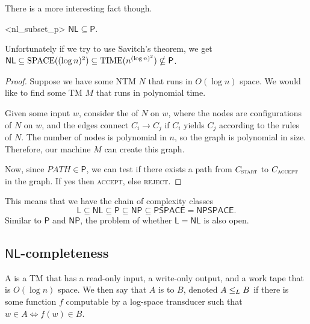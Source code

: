 \documentclass{standalone}
\begin{document}
There is a more interesting fact though.
\begin{proposition}<nl_subset_p>
  \(\mathsf{NL} \subseteq \mathsf{P}\).
\end{proposition}
Unfortunately if we try to use Savitch's theorem, we get
\(\mathsf{NL} \subseteq \operatorname{SPACE}((\log n)^2)
              \subseteq \operatorname{TIME}(n^{(\log n)^2}) \nsubseteq \mathsf{P}\).
\begin{proof}
  Suppose we have some \textsf{NTM} \(N\) that runs in \(O(\log n)\) space.
  We would like to find some \textsf{TM} \(M\) that runs in polynomial time.

  Given some input \(w\),
  consider the  of \(N\) on \(w\),
  where the nodes are configurations of \(N\) on \(w\),
  and the edges connect \(C_i \to C_j\) if \(C_i\) yields \(C_j\)
  according to the rules of \(N\).
  The number of nodes is polynomial in \(n\),
  so the graph is polynomial in size.
  Therefore, our machine \(M\) can create this graph.

  Now, since \(\textit{PATH} \in \mathsf{P}\),
  we can test if there exists a path from
  \(C_{\textsc{start}}\) to \(C_{\textsc{accept}}\) in the graph.
  If yes then \textsc{accept}, else \textsc{reject}.
\end{proof}

This means that we have the chain of complexity classes
\[
  \mathsf{L} \subseteq \mathsf{NL}
             \subseteq \mathsf{P}
             \subseteq \mathsf{NP}
             \subseteq \mathsf{PSPACE} = \mathsf{NPSPACE}.
\]
Similar to \(\mathsf{P}\) and \(\mathsf{NP}\),
the problem of whether \(\mathsf L = \mathsf{NL}\) is also open.

\subsection{\texorpdfstring{\(\mathsf{NL}\)}{NL}-completeness}
\begin{definition}
  A  is a \textsf{TM} that has a read-only input,
  a write-only output, and a work tape that is \(O(\log n)\) space.
  We then say that \(A\) is  to \(B\),
  denoted \(A \mathrel{\leq_L} B\) if there is some function \(f\)
  computable by a log-space transducer such that \(w \in A \iff f(w) \in B\).
\end{definition}
\end{document}
